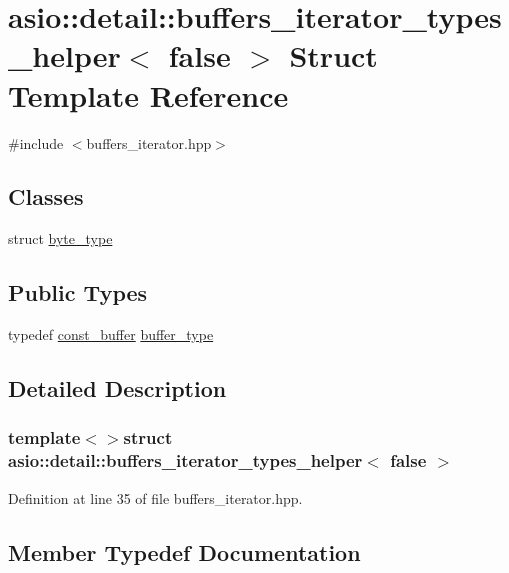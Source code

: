 \hypertarget{structasio_1_1detail_1_1buffers__iterator__types__helper_3_01false_01_4}{}\section{asio\+:\+:detail\+:\+:buffers\+\_\+iterator\+\_\+types\+\_\+helper$<$ false $>$ Struct Template Reference}
\label{structasio_1_1detail_1_1buffers__iterator__types__helper_3_01false_01_4}


{\ttfamily \#include $<$buffers\+\_\+iterator.\+hpp$>$}

\subsection*{Classes}
\begin{DoxyCompactItemize}
\item 
struct \hyperlink{structasio_1_1detail_1_1buffers__iterator__types__helper_3_01false_01_4_1_1byte__type}{byte\+\_\+type}
\end{DoxyCompactItemize}
\subsection*{Public Types}
\begin{DoxyCompactItemize}
\item 
typedef \hyperlink{classasio_1_1const__buffer}{const\+\_\+buffer} \hyperlink{structasio_1_1detail_1_1buffers__iterator__types__helper_3_01false_01_4_ab4d0d844258fc4683e4c9922a99b963e}{buffer\+\_\+type}
\end{DoxyCompactItemize}


\subsection{Detailed Description}
\subsubsection*{template$<$$>$struct asio\+::detail\+::buffers\+\_\+iterator\+\_\+types\+\_\+helper$<$ false $>$}



Definition at line 35 of file buffers\+\_\+iterator.\+hpp.



\subsection{Member Typedef Documentation}
\hypertarget{structasio_1_1detail_1_1buffers__iterator__types__helper_3_01false_01_4_ab4d0d844258fc4683e4c9922a99b963e}{}
